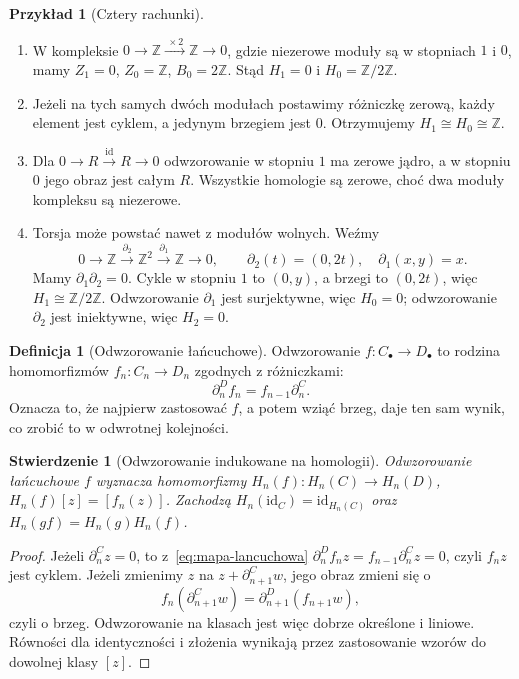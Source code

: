 \documentclass[11pt,a4paper,oneside]{report}
\newcommand{\Z}{\mathbb{Z}}
\newcommand{\id}{\mathrm{id}}
\theoremstyle{plain}
\newtheorem{stwierdzenie}[twierdzenie]{Stwierdzenie}
\theoremstyle{definition}
\newtheorem{definicja}[twierdzenie]{Definicja}
\newtheorem{przyklad}[twierdzenie]{Przykład}
\theoremstyle{remark}
\begin{document}
\begin{przyklad}[Cztery rachunki]
\label{prz:homologia-rachunki}
\begin{enumerate}[leftmargin=*]
\item W kompleksie
      $0\to\Z\xrightarrow{\ \times2\ }\Z\to0$,
      gdzie niezerowe moduły są w stopniach
      $1$ i $0$, mamy $Z_1=0$, $Z_0=\Z$,
      $B_0=2\Z$. Stąd
      $H_1=0$ i $H_0=\Z/2\Z$.
\item Jeżeli na tych samych dwóch modułach
      postawimy różniczkę zerową, każdy element
      jest cyklem, a jedynym brzegiem jest $0$.
      Otrzymujemy $H_1\cong H_0\cong\Z$.
\item Dla
      $0\to R\xrightarrow{\ \id\ }R\to0$
      odwzorowanie w stopniu $1$ ma zerowe jądro,
      a w stopniu $0$ jego obraz jest całym $R$.
      Wszystkie homologie są zerowe, choć
      dwa moduły kompleksu są niezerowe.
\item Torsja może powstać nawet z modułów
      wolnych. Weźmy
      \[
       0\longrightarrow\Z
       \xrightarrow{\ \partial_2\ }\Z^2
       \xrightarrow{\ \partial_1\ }\Z
       \longrightarrow0,\qquad
       \partial_2(t)=(0,2t),\quad \partial_1(x,y)=x.
      \]
      Mamy $\partial_1\partial_2=0$.
      Cykle w stopniu $1$ to $(0,y)$,
      a brzegi to $(0,2t)$, więc
      $H_1\cong\Z/2\Z$. Odwzorowanie $\partial_1$ jest
      surjektywne, więc $H_0=0$; odwzorowanie
      $\partial_2$ jest iniektywne, więc $H_2=0$.
\end{enumerate}
\end{przyklad}

\begin{definicja}[Odwzorowanie łańcuchowe]
\label{def:mapa-lancuchowa}
Odwzorowanie $f:C_\bullet\to D_\bullet$ to rodzina
homomorfizmów $f_n:C_n\to D_n$ zgodnych
z różniczkami:
\begin{equation}\label{eq:mapa-lancuchowa}
 \partial^D_n f_n=f_{n-1}\partial^C_n.
\end{equation}
Oznacza to, że najpierw zastosować $f$,
a potem wziąć brzeg, daje ten sam wynik,
co zrobić to w odwrotnej kolejności.
\end{definicja}

\begin{stwierdzenie}[Odwzorowanie indukowane na homologii]
\label{prop:homologia-funktor}
Odwzorowanie łańcuchowe $f$ wyznacza homomorfizmy
$H_n(f):H_n(C)\to H_n(D)$,
$H_n(f)[z]=[f_n(z)]$. Zachodzą
$H_n(\id_C)=\id_{H_n(C)}$ oraz
$H_n(gf)=H_n(g)H_n(f)$.
\end{stwierdzenie}
\begin{proof}
Jeżeli $\partial^C_n z=0$, to z~\eqref{eq:mapa-lancuchowa}
$\partial^D_n f_nz=f_{n-1}\partial^C_nz=0$, czyli
$f_nz$ jest cyklem. Jeżeli zmienimy
$z$ na $z+\partial^C_{n+1}w$, jego obraz zmieni się o
\[
 f_n(\partial^C_{n+1}w)
 =\partial^D_{n+1}(f_{n+1}w),
\]
czyli o brzeg. Odwzorowanie na klasach jest więc
dobrze określone i liniowe.
Równości dla identyczności i złożenia
wynikają przez zastosowanie wzorów
do dowolnej klasy $[z]$.
\end{proof}
\end{document}
